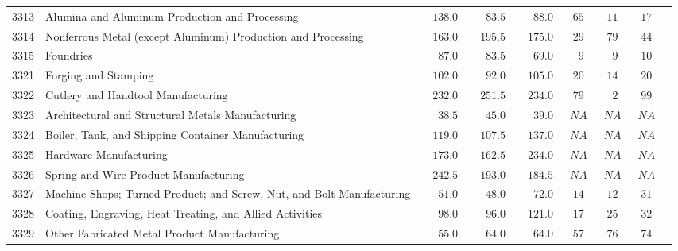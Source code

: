 \documentclass[9pt, oneside]{article}   	%
\begin{document}
\begin{longtable}{lp{3.5 in}ccccccc}
3313  & Alumina and Aluminum Production and Processing & $\phantom{00}138.0$ & $\phantom{000}83.5$ & $\phantom{000}88.0$ & $\phantom{0}65$ & $\phantom{0}11$ & $\phantom{0}17$ \\
3314  & Nonferrous Metal (except Aluminum) Production and Processing & $\phantom{00}163.0$ & $\phantom{00}195.5$ & $\phantom{00}175.0$ & $\phantom{0}29$ & $\phantom{0}79$ & $\phantom{0}44$ \\
3315  & Foundries & $\phantom{000}87.0$ & $\phantom{000}83.5$ & $\phantom{000}69.0$ & $\phantom{00}9$ & $\phantom{00}9$ & $\phantom{0}10$ \\
3321  & Forging and Stamping & $\phantom{00}102.0$ & $\phantom{000}92.0$ & $\phantom{00}105.0$ & $\phantom{0}20$ & $\phantom{0}14$ & $\phantom{0}20$ \\
3322  & Cutlery and Handtool Manufacturing & $\phantom{00}232.0$ & $\phantom{00}251.5$ & $\phantom{00}234.0$ & $\phantom{0}79$ & $\phantom{00}2$ & $\phantom{0}99$ \\
3323  & Architectural and Structural Metals Manufacturing & $\phantom{000}38.5$ & $\phantom{000}45.0$ & $\phantom{000}39.0$ & $\phantom{0}NA$ & $\phantom{0}NA$ & $\phantom{0}NA$ \\
3324  & Boiler, Tank, and Shipping Container Manufacturing & $\phantom{00}119.0$ & $\phantom{00}107.5$ & $\phantom{00}137.0$ & $\phantom{0}NA$ & $\phantom{0}NA$ & $\phantom{0}NA$ \\
3325  & Hardware Manufacturing & $\phantom{00}173.0$ & $\phantom{00}162.5$ & $\phantom{00}234.0$ & $\phantom{0}NA$ & $\phantom{0}NA$ & $\phantom{0}NA$ \\
3326  & Spring and Wire Product Manufacturing & $\phantom{00}242.5$ & $\phantom{00}193.0$ & $\phantom{00}184.5$ & $\phantom{0}NA$ & $\phantom{0}NA$ & $\phantom{0}NA$ \\
3327  & Machine Shops; Turned Product; and Screw, Nut, and Bolt Manufacturing & $\phantom{000}51.0$ & $\phantom{000}48.0$ & $\phantom{000}72.0$ & $\phantom{0}14$ & $\phantom{0}12$ & $\phantom{0}31$ \\
3328  & Coating, Engraving, Heat Treating, and Allied Activities & $\phantom{000}98.0$ & $\phantom{000}96.0$ & $\phantom{00}121.0$ & $\phantom{0}17$ & $\phantom{0}25$ & $\phantom{0}32$ \\
3329  & Other Fabricated Metal Product Manufacturing & $\phantom{000}55.0$ & $\phantom{000}64.0$ & $\phantom{000}64.0$ & $\phantom{0}57$ & $\phantom{0}76$ & $\phantom{0}74$ \\

\end{longtable}
\end{document}
